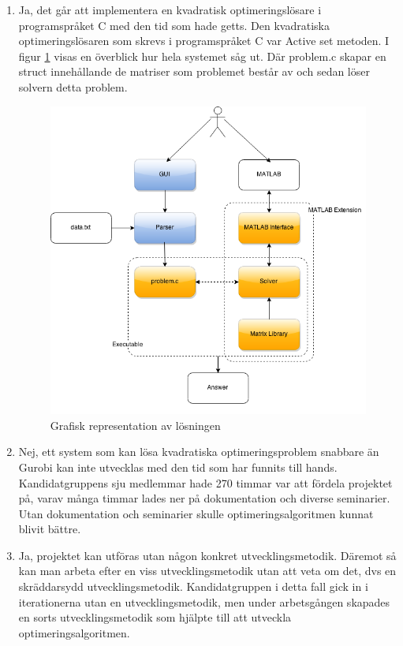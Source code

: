 \begin{enumerate}
\item Ja, det går att implementera en kvadratisk optimeringslösare i programspråket C med den tid som hade getts. Den kvadratiska optimeringslösaren som skrevs i programspråket C var Active set metoden. I figur \ref{fig:arkitektur} visas en överblick hur hela systemet såg ut. Där problem.c skapar en struct innehållande de matriser som problemet består av och sedan löser solvern detta problem.

\begin{figure}[h]
\centerline{\includegraphics[scale=0.5]{grafik/arkitektur}}
\caption{Grafisk representation av lösningen}
\label{fig:arkitektur}
\end{figure}

\item Nej, ett system som kan lösa kvadratiska optimeringsproblem snabbare än Gurobi kan inte utvecklas med den tid som har funnits till hands. Kandidatgruppens sju medlemmar hade 270 timmar var att fördela projektet på, varav många timmar lades ner på dokumentation och diverse seminarier. Utan dokumentation och seminarier skulle optimeringsalgoritmen kunnat blivit bättre.

\item Ja, projektet kan utföras utan någon konkret utvecklingsmetodik. Däremot så kan man arbeta efter en viss utvecklingsmetodik utan att veta om det, dvs en skräddarsydd utvecklingsmetodik. Kandidatgruppen i detta fall gick in i iterationerna utan en utvecklingsmetodik, men under arbetsgången skapades en sorts utvecklingsmetodik som hjälpte till att utveckla optimeringsalgoritmen.
\end{enumerate}
	
